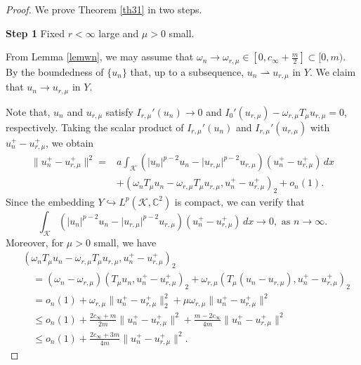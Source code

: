 \documentclass[11pt]{amsart}
\newcommand{\abs}[1]{\lvert#1\rvert}
\newcommand{\norm}[1]{\lVert#1\rVert}
\newcommand{\K}{\mathcal{K}}
\numberwithin{equation}{section}
\begin{document}
\begin{proof}
We  prove Theorem \ref{th31} in two steps.

{\bf Step 1} Fixed $r<\infty$ large and $\mu>0$ small.

From Lemma \ref{lemwn}, we may assume that $\omega_{n} \to \omega_{r, \mu} \in[0, c_{\infty}+\frac{m}{2}] \subset [0, m)$. By the boundedness of $\{u_{n}\}$ that, up to a subsequence, $u_{n} \rightharpoonup u_{r, \mu}$ in $Y$.  We claim that $u_{n} \to u_{r, \mu}$ in $Y$.

 Note that, $u_{n}$ and $u_{r, \mu}$ satisfy $I_{r,\mu}'(u_n) \to 0$ and $I_{0}'(u_{r, \mu}) - \omega_{r, \mu}T_{\mu}u_{r, \mu} = 0$, respectively. Taking the scalar product of $I_{r,\mu}'(u_n)$ and $I_{r,\mu}'(u_{r,\mu})$ with $u_{n}^{+}-u_{r, \mu}^{+}$, we obtain
\begin{equation}\label{equn+}
    \begin{aligned}
\norm{u_{n}^{+}-u_{r, \mu}^{+}}^{2}= & a\int_{\K} (\abs{u_{n}}^{p-2} u_{n}-\abs{u_{r, \mu}}^{p-2} u_{r, \mu})(u_{n}^{+}-u_{r, \mu}^{+}) \,dx  \\
& +(\omega_{n} T_{\mu} u_{n}-\omega_{r, \mu} T_{\mu} u_{r, \mu}, u_{n}^{+}-u_{r, \mu}^{+})_{2}+o_{n}(1).
\end{aligned}
\end{equation}
Since the embedding $ Y \hookrightarrow L^p(\K,\mathbb{C}^2)$ is compact, we can verify that
\begin{equation}
    \int_{\K} (\abs{u_{n}}^{p-2} u_{n}-\abs{u_{r, \mu}}^{p-2} u_{r, \mu})(u_{n}^{+}-u_{r, \mu}^{+}) \, dx \to 0,\,\,\text{as}\,\, n \rightarrow \infty.
\end{equation}
Moreover, for $\mu>0$ small, we have
\begin{equation}\label{eqomegantmu}
   \begin{aligned}
&(\omega_{n} T_{\mu} u_{n}-\omega_{r, \mu} T_{\mu} u_{r, \mu}, u_{n}^{+}-u_{r, \mu}^{+})_{2} \\
&\quad =(\omega_{n}-\omega_{r, \mu})(T_{\mu} u_{n}, u_{n}^{+}-u_{r, \mu}^{+})_{2}+\omega_{r, \mu}(T_{\mu}(u_{n}-u_{r, \mu}), u_{n}^{+}-u_{r, \mu}^{+})_{2} \\
&\quad =o_{n}(1)+\omega_{r, \mu}\norm{u_{n}^{+}-u_{r, \mu}^{+}}_{2}^{2}+\mu \omega_{r, \mu}\norm{u_{n}^{+}-u_{r, \mu}^{+}}^{2}\\
&\quad \leq o_{n}(1)+\frac{2 c_{\infty}+m}{2 m}\norm{u_{n}^{+}-u_{r, \mu}^{+}}^{2}+\frac{m-2 c_{\infty}}{4 m}\norm{u_{n}^{+}-u_{r, \mu}^{+}}^{2} \\
&\quad \leq o_{n}(1)+\frac{2 c_{\infty}+3 m}{4 m}\norm{u_{n}^{+}-u_{r, \mu}^{+}}^{2} .

\end{aligned}
\end{equation}
\end{proof}
\end{document}
